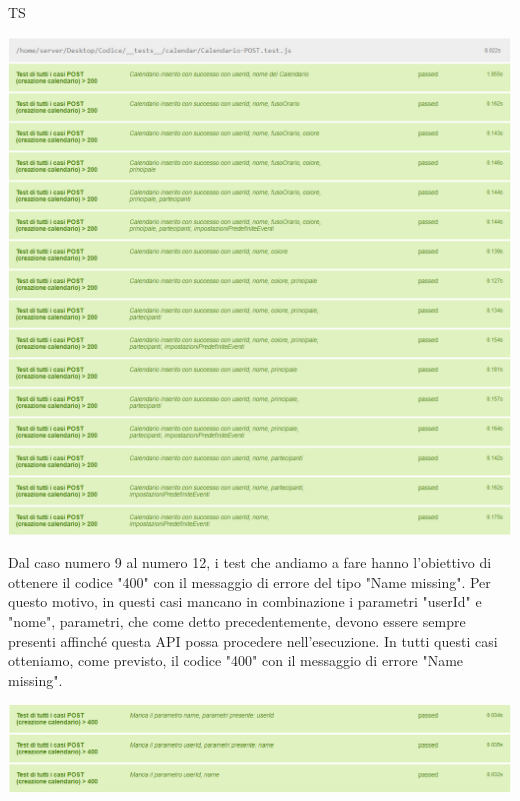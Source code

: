 \begin{listaPersonale}{TS}
                \begin{center}
                        \includegraphics[width=1\textwidth, height=0.7\textheight]{img/png/tests/CalendarioPost/200_postCalendario.png}
                \end{center}
                Dal caso numero 9 al numero 12, i test che andiamo a fare hanno l'obiettivo di ottenere il codice "400" con il messaggio di errore del tipo "Name missing". Per questo motivo, in questi casi mancano in combinazione i parametri "userId" e "nome", parametri, che come detto precedentemente, devono essere sempre presenti affinché questa API possa procedere nell'esecuzione. In tutti questi casi otteniamo, come previsto, il codice "400" con il messaggio di errore "Name missing".
                \begin{center}
                        \includegraphics[width=1\textwidth, height=0.13\textheight]{img/png/tests/CalendarioPost/400_missingParameter_PostCalendario.png}

\end{center}
\end{listaPersonale}
